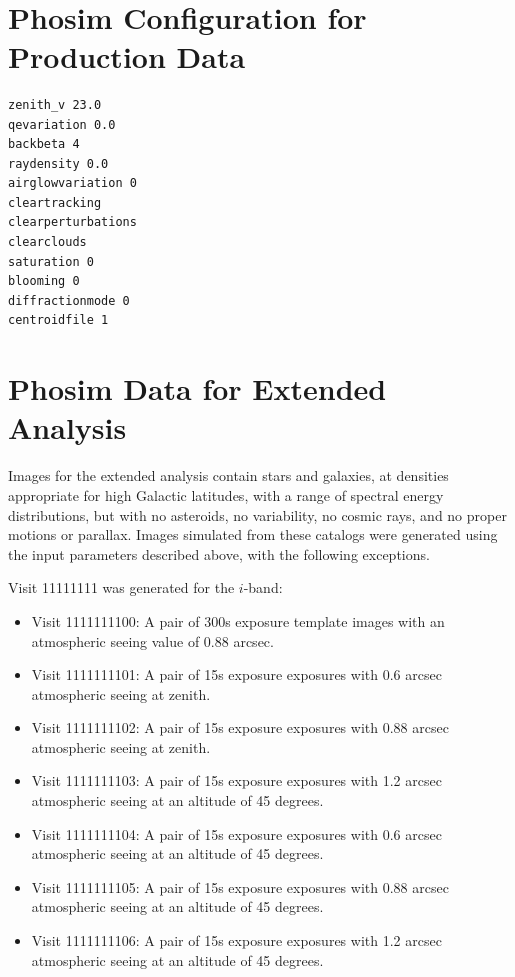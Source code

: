 \documentclass[prd, nofootinbib, floatfix, 11pt,tightenlines,times]{article}
\begin{document}
\begin{figure}%
\captionsetup[subfloat]{labelformat=empty}
\centering
{}
\\
%
%
%
\caption{}
\label{fig-fp_v_thresh}
\end{figure}

\clearpage 
\begin{appendices}
\section{Phosim Configuration for Production Data \label{sec-phosim}}
\begin{verbatim}
zenith_v 23.0
qevariation 0.0
backbeta 4
raydensity 0.0
airglowvariation 0
cleartracking
clearperturbations
clearclouds
saturation 0
blooming 0
diffractionmode 0
centroidfile 1
\end{verbatim}

\section{Phosim Data for Extended Analysis \label{sec-phosimextend}}

Images for the extended analysis contain stars and galaxies, at
densities appropriate for high Galactic latitudes, with a range of
spectral energy distributions, but with no asteroids, no variability,
no cosmic rays, and no proper motions or parallax.  Images simulated
from these catalogs were generated using the input parameters
described above, with the following exceptions.

Visit 11111111 was generated for the $i$-band:
\begin{itemize}
\item Visit 1111111100: A pair of 300s exposure template images with
  an atmospheric seeing value of 0.88 arcsec.
\item Visit 1111111101: A pair of 15s exposure exposures with 0.6
arcsec atmospheric seeing at zenith.
\item Visit 1111111102: A pair of 15s exposure exposures with 0.88
arcsec atmospheric seeing at zenith.
\item Visit 1111111103: A pair of 15s exposure exposures with 1.2
arcsec atmospheric seeing at an altitude of 45 degrees.
\item Visit 1111111104: A pair of 15s exposure exposures with 0.6
arcsec atmospheric seeing at an altitude of 45 degrees.
\item Visit 1111111105: A pair of 15s exposure exposures with 0.88
arcsec atmospheric seeing at an altitude of 45 degrees.
\item Visit 1111111106: A pair of 15s exposure exposures with 1.2
arcsec atmospheric seeing at an altitude of 45 degrees.
\end{itemize}


\end{appendices}
\end{document}
